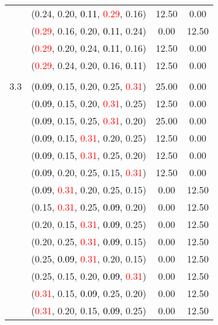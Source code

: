 \documentclass[10pt,a4paper]{report}
\begin{document}
\begin{center}
\begin{longtable}{clcc}
			&(0.24, 0.20, \textcolor{black}{0.11}, \textcolor{red}{0.29}, 0.16)&12.50&0.00\\
			&(\textcolor{red}{0.29}, 0.16, 0.20, \textcolor{black}{0.11}, 0.24)&0.00&12.50\\
			&(\textcolor{red}{0.29}, 0.20, 0.24, \textcolor{black}{0.11}, 0.16)&12.50&0.00\\
			&(\textcolor{red}{0.29}, 0.24, 0.20, 0.16, \textcolor{black}{0.11})&12.50&0.00\\
		&&&\\
		3.3			&(\textcolor{black}{0.09}, 0.15, 0.20, 0.25, \textcolor{red}{0.31})&25.00&0.00\\
			&(\textcolor{black}{0.09}, 0.15, 0.20, \textcolor{red}{0.31}, 0.25)&12.50&0.00\\
			&(\textcolor{black}{0.09}, 0.15, 0.25, \textcolor{red}{0.31}, 0.20)&25.00&0.00\\
			&(\textcolor{black}{0.09}, 0.15, \textcolor{red}{0.31}, 0.20, 0.25)&12.50&0.00\\
			&(\textcolor{black}{0.09}, 0.15, \textcolor{red}{0.31}, 0.25, 0.20)&12.50&0.00\\
			&(\textcolor{black}{0.09}, 0.20, 0.25, 0.15, \textcolor{red}{0.31})&12.50&0.00\\
			&(\textcolor{black}{0.09}, \textcolor{red}{0.31}, 0.20, 0.25, 0.15)&0.00&12.50\\
			&(0.15, \textcolor{red}{0.31}, 0.25, \textcolor{black}{0.09}, 0.20)&0.00&12.50\\
			&(0.20, 0.15, \textcolor{red}{0.31}, \textcolor{black}{0.09}, 0.25)&0.00&12.50\\
			&(0.20, 0.25, \textcolor{red}{0.31}, \textcolor{black}{0.09}, 0.15)&0.00&12.50\\
			&(0.25, \textcolor{black}{0.09}, \textcolor{red}{0.31}, 0.20, 0.15)&0.00&12.50\\
			&(0.25, 0.15, 0.20, \textcolor{black}{0.09}, \textcolor{red}{0.31})&0.00&12.50\\
			&(\textcolor{red}{0.31}, 0.15, \textcolor{black}{0.09}, 0.25, 0.20)&0.00&12.50\\
			&(\textcolor{red}{0.31}, 0.20, 0.15, \textcolor{black}{0.09}, 0.25)&0.00&12.50\\
		\bottomrule
	\end{longtable}
\end{center}
\end{document}
